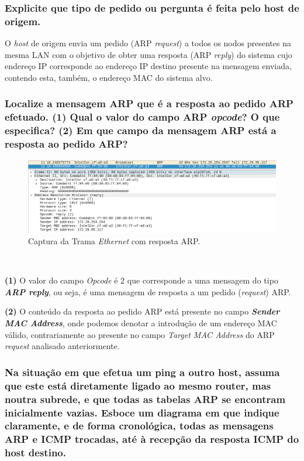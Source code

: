 \subsubsection{Explicite que tipo de pedido ou pergunta é feita pelo host de origem.}

    \par O \textit{host} de origem envia um pedido (ARP \textit{request}) a todos os nodos presentes na mesma LAN com o objetivo de obter uma resposta (ARP \textit{reply}) do sistema cujo endereço IP corresponde ao endereço IP destino presente na mensagem enviada, contendo esta, também, o endereço MAC do sistema alvo.


\subsubsection{Localize a mensagem ARP que é a resposta ao pedido ARP efetuado. (1) Qual o valor do campo ARP \textit{opcode}? O que especifica? (2) Em que campo da mensagem ARP está a resposta ao pedido ARP? }

    \begin{figure}[H]
    \centering
    \includegraphics[width=500pt]{prints/Questao4/questao4-responseARP.png}
    \caption{Captura da Trama \textit{Ethernet} com resposta ARP.} \label{questao3-ARPResponse}
    \end{figure}
    
    \
    \par \textbf{(1)} O valor do campo \textit{Opcode} é 2 que corresponde a uma mensagem do tipo \textit{\textbf{ARP reply}}, ou seja, é uma mensagem de resposta a um pedido (\textit{request}) ARP.
    
    \par \textbf{(2)} O conteúdo da resposta ao pedido ARP está presente no campo \textbf{\textit{Sender MAC Address}}, onde podemos denotar a introdução de um endereço MAC válido, contrariamente ao presente no campo \textit{Target MAC Address} do ARP \textit{request} analisado anteriormente.




\newpage
\subsubsection{Na situação em que efetua um ping a outro host, assuma que este está diretamente ligado ao mesmo router, mas noutra subrede, e que todas as tabelas ARP se encontram inicialmente vazias. Esboce um diagrama em que indique claramente, e de forma cronológica, todas as mensagens ARP e ICMP trocadas, até à recepção da resposta ICMP do host destino.}


